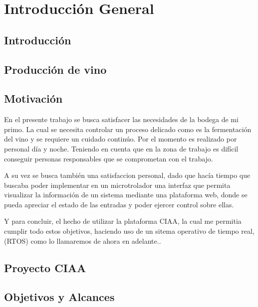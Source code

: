 
\chapter{Introducción General} %

\label{Chapter1} %
\label{IntroGeneral}


\newcommand{\keyword}[1]{\textbf{#1}}
\newcommand{\tabhead}[1]{\textbf{#1}}
\newcommand{\code}[1]{\texttt{#1}}
\newcommand{\file}[1]{\texttt{\bfseries#1}}
\newcommand{\option}[1]{\texttt{\itshape#1}}
\newcommand{\grados}{$^{\circ}$}


\section{Introducción}


\section{Producción de vino}


\section{Motivación}

En el presente trabajo se busca satisfacer las necesidades de la bodega de mi primo. La cual se necesita controlar un proceso delicado como es la fermentación del vino y se requiere un cuidado continúo. Por el momento es realizado por personal día y noche. Teniendo en cuenta que en la zona de trabajo es difícil conseguir personas responsables que se comprometan con el trabajo. 

A su vez se busca también una satisfaccion personal, dado que hacía tiempo que buscaba poder implementar en un microtrolador una interfaz que permita visualizar la información de un sistema mediante una plataforma web, donde se pueda apreciar el estado de las entradas y poder ejercer control sobre ellas.

Y para concluir, el hecho de utilizar la plataforma CIAA, la cual me permitia cumplir todo estos objetivos, haciendo uso de un sitema operativo de tiempo real,(RTOS) como lo llamaremos de ahora en adelante..



\section{Proyecto CIAA}

\section{Objetivos y Alcances}





